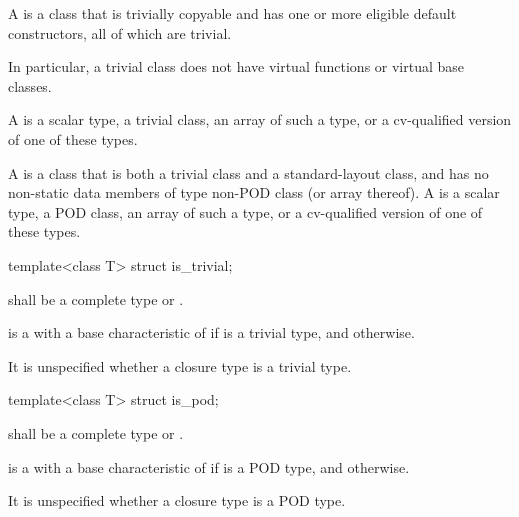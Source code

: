 \pnum
\label{term.trivial.type}%
A  is a class that is trivially copyable and
has one or more eligible default constructors, all of which are trivial.
\begin{note}
In particular,
a trivial class does not have virtual functions or virtual base classes.
\end{note}
A  is a scalar type, a trivial class,
an array of such a type, or a cv-qualified version of one of these types.

\pnum
{}%
A  is a class that is both a trivial class and a
standard-layout class, and has no non-static data members of type non-POD class
(or array thereof). A  is a scalar type, a POD class, an array
of such a type, or a cv-qualified version of one of these types.

%
\begin{itemdecl}
template<class T> struct is_trivial;
\end{itemdecl}

\begin{itemdescr}
\pnum
\expects
{} shall be a complete type or \cv{} .

\pnum
\remarks
{} is a 
with a base characteristic of 
if  is a trivial type,
and  otherwise.

\pnum
\begin{note}
It is unspecified
whether a closure type is a trivial type.
\end{note}
\end{itemdescr}

%
\begin{itemdecl}
template<class T> struct is_pod;
\end{itemdecl}

\begin{itemdescr}
\pnum
\expects
{} shall be a complete type or \cv{} .

\pnum
\remarks
{} is a 
with a base characteristic of 
if  is a POD type,
and  otherwise.

\pnum
\begin{note}
It is unspecified whether a closure type is a POD type.
\end{note}
\end{itemdescr}

